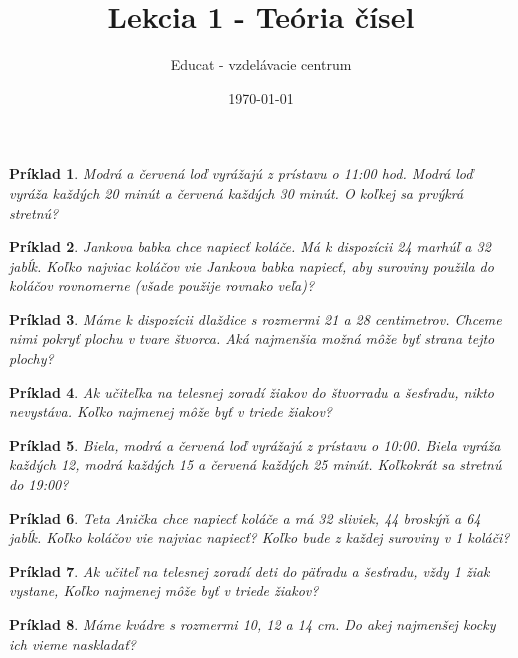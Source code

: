 \documentclass{article}
\title{Lekcia 1 - Teória čísel}
\date{\today}
\author{Educat - vzdelávacie centrum}
\newtheorem{example}{Príklad}
\begin{document}
	\maketitle
	
	\begin{example}
		Modrá a červená loď vyrážajú z prístavu o 11:00 hod. Modrá loď vyráža každých 20 minút a červená každých 30 minút. O koľkej sa prvýkrá stretnú?
	\end{example}
	
	\begin{example}
		Jankova babka chce napiecť koláče. Má k dispozícii 24 marhúľ a 32 jabĺk. Koľko najviac koláčov vie Jankova babka napiecť, aby suroviny použila do koláčov rovnomerne (všade použije rovnako veľa)? 
	\end{example}
	
	\begin{example}
		Máme k dispozícii dlaždice s rozmermi 21 a 28 centimetrov. Chceme nimi pokryť plochu v tvare štvorca. Aká najmenšia možná môže byť strana tejto plochy?
	\end{example}
	
	\begin{example}
		Ak učiteľka na telesnej zoradí žiakov do štvorradu a šesťradu, nikto nevystáva. Koľko najmenej môže byť v triede žiakov?
	\end{example}
	
	\begin{example}
		Biela, modrá a červená loď vyrážajú z prístavu o 10:00. Biela vyráža každých 12, modrá každých 15 a červená každých 25 minút. Koľkokrát sa stretnú do 19:00? 
	\end{example}
	
	\begin{example}
		Teta Anička chce napiecť koláče a má 32 sliviek, 44 broskýň a 64 jabĺk. Koľko koláčov vie najviac napiecť? Koľko bude z každej suroviny v 1 koláči? 
	\end{example}
	
	\begin{example}
		Ak učiteľ na telesnej zoradí deti do päťradu a šesťradu, vždy 1 žiak vystane, Koľko najmenej môže byť v triede žiakov?
	\end{example}
	
	\begin{example}
		Máme kvádre s rozmermi 10, 12 a 14 cm. Do akej najmenšej kocky ich vieme naskladať?
	\end{example}
\end{document}
